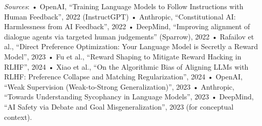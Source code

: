\documentclass{article}
\begin{document}
\textit{Sources}:
	•	OpenAI, “Training Language Models to Follow Instructions with Human Feedback”, 2022 (InstructGPT)   
	•	Anthropic, “Constitutional AI: Harmlessness from AI Feedback”, 2022   
	•	DeepMind, “Improving alignment of dialogue agents via targeted human judgements” (Sparrow), 2022  
	•	Rafailov et al., “Direct Preference Optimization: Your Language Model is Secretly a Reward Model”, 2023 
	•	Fu et al., “Reward Shaping to Mitigate Reward Hacking in RLHF”, 2024   
	•	Xiao et al., “On the Algorithmic Bias of Aligning LLMs with RLHF: Preference Collapse and Matching Regularization”, 2024  
	•	OpenAI, “Weak Supervision (Weak-to-Strong Generalization)”, 2023  
	•	Anthropic, “Towards Understanding Sycophancy in Language Models”, 2023  
	•	DeepMind, “AI Safety via Debate and Goal Misgeneralization”, 2023  (for conceptual context).
\end{document}
